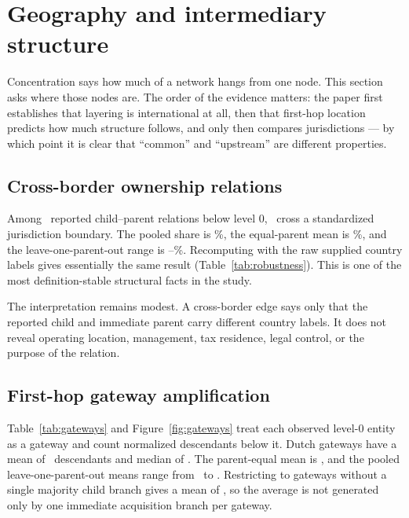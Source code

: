 \documentclass[11pt]{article}
\newcommand{\pct}{\%}
\newcommand{\FloatBarrier}{\clearpage}
\begin{document}
\FloatBarrier

\section{Geography and intermediary structure}
\label{sec:geography}

Concentration says how much of a network hangs from one node. This section asks
where those nodes are. The order of the evidence matters: the paper first
establishes that layering is international at all, then that first-hop location
predicts how much structure follows, and only then compares jurisdictions --- by
which point it is clear that ``common'' and ``upstream'' are different
properties.

\subsection{Cross-border ownership relations}

Among \NonrootEdges\ reported child--parent relations below level 0,
\CrossBorderEdges\ cross a standardized jurisdiction boundary. The pooled
share is \CrossBorderPct\pct, the equal-parent mean is
\CrossBorderEqualPct\pct, and the leave-one-parent-out range is
\CrossBorderLooLow--\CrossBorderLooHigh\pct. Recomputing with the raw supplied
country labels gives essentially the same result (Table~\ref{tab:robustness}).
This is one of the most definition-stable structural facts in the study.

The interpretation remains modest. A cross-border edge says only that the
reported child and immediate parent carry different country labels. It does
not reveal operating location, management, tax residence, legal control, or
the purpose of the relation.

\subsection{First-hop gateway amplification}

Table~\ref{tab:gateways} and Figure~\ref{fig:gateways} treat each observed
level-0 entity as a gateway and count normalized descendants below it. Dutch
gateways have a mean of \DutchGatewayMean\ descendants and median of
\DutchGatewayMedian. The parent-equal mean is \DutchGatewayEqualMean, and the
pooled leave-one-parent-out means range from \DutchGatewayLooLow\ to
\DutchGatewayLooHigh. Restricting to gateways without a single majority child
branch gives a mean of \DutchGatewayRobustMean, so the average is not generated
only by one immediate acquisition branch per gateway.
\end{document}

